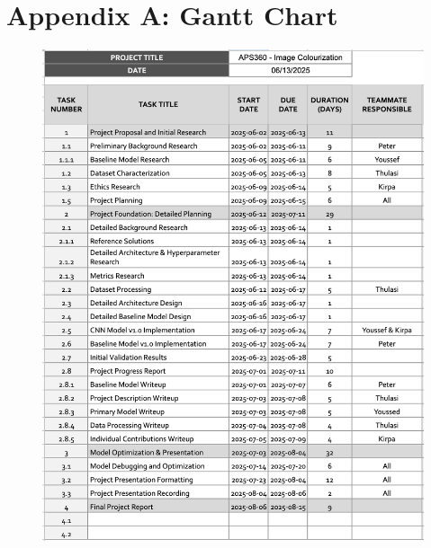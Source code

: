 \documentclass{article} %
\begin{document}
\label{last_page}

\newpage



\newpage
\section{Appendix A: Gantt Chart}

\begin{figure}[ht]
  \centering
  \includegraphics[width=1\linewidth]{Figs/task-names.png}
  \label{fig:task-names}
\end{figure}

\end{document}
